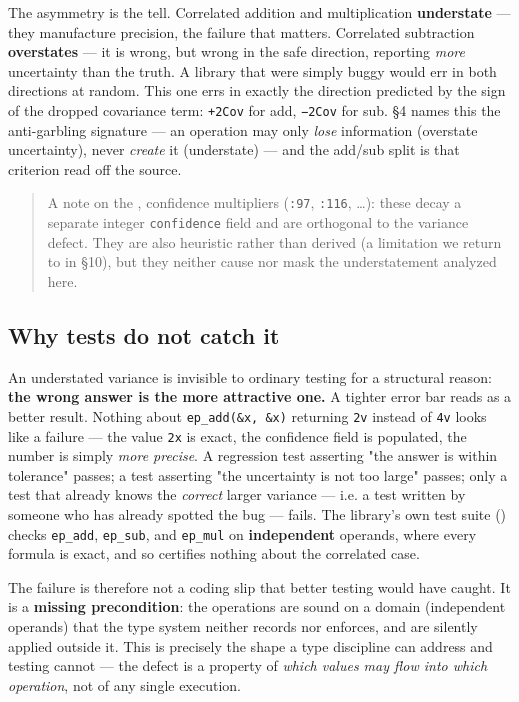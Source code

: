 \documentclass[sigplan,review,anonymous,10pt]{acmart}
\begin{document}
The asymmetry is the tell. Correlated addition and multiplication \textbf{understate} --- they manufacture precision, the failure that matters. Correlated subtraction \textbf{overstates} --- it is wrong, but wrong in the safe direction, reporting \emph{more} uncertainty than the truth. A library that were simply buggy would err in both directions at random. This one errs in exactly the direction predicted by the sign of the dropped covariance term: \texttt{+2Cov} for add, \texttt{−2Cov} for sub. §4 names this the anti-garbling signature --- an operation may only \emph{lose} information (overstate uncertainty), never \emph{create} it (understate) --- and the add/sub split is that criterion read off the source.

\begin{quote}
A note on the ,  confidence multipliers (\texttt{:97}, \texttt{:116}, \ldots{}): these decay a separate integer \texttt{confidence} field and are orthogonal to the variance defect. They are also heuristic rather than derived (a limitation we return to in §10), but they neither cause nor mask the understatement analyzed here.
\end{quote}

\subsection{Why tests do not catch it}

An understated variance is invisible to ordinary testing for a structural reason: \textbf{the wrong answer is the more attractive one.} A tighter error bar reads as a better result. Nothing about \texttt{ep\_add(\&x, \&x)} returning \texttt{2v} instead of \texttt{4v} looks like a failure --- the value \texttt{2x} is exact, the confidence field is populated, the number is simply \emph{more precise}. A regression test asserting "the answer is within tolerance" passes; a test asserting "the uncertainty is not too large" passes; only a test that already knows the \emph{correct} larger variance --- i.e. a test written by someone who has already spotted the bug --- fails. The library's own test suite () checks \texttt{ep\_add}, \texttt{ep\_sub}, and \texttt{ep\_mul} on \textbf{independent} operands, where every formula is exact, and so certifies nothing about the correlated case.

The failure is therefore not a coding slip that better testing would have caught. It is a \textbf{missing precondition}: the operations are sound on a domain (independent operands) that the type system neither records nor enforces, and are silently applied outside it. This is precisely the shape a type discipline can address and testing cannot --- the defect is a property of \emph{which values may flow into which operation}, not of any single execution.
\end{document}
